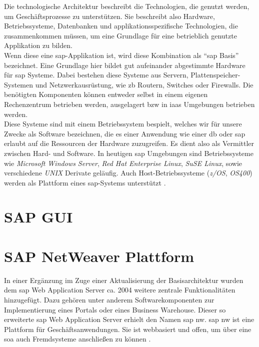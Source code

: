 Die technologische Architektur beschreibt die Technologien, die genutzt werden, um Geschäftsprozesse zu unterstützen. Sie beschreibt also Hardware, Betriebssysteme, Datenbanken und applikationsspezifische Technologien, die zusammenkommen müssen, um eine Grundlage für eine betrieblich genutzte Applikation zu bilden.\\
Wenn diese eine \gls{sap}-Applikation ist, wird diese Kombination als "`\gls{sap} Basis"' bezeichnet.
Eine Grundlage hier bildet gut aufeinander abgestimmte Hardware für \gls{sap} Systeme. Dabei bestehen diese Systeme aus Servern, Plattenspeicher-Systemen und Netzwerkausrüstung, wie \gls{zb} Routern, Switches oder Firewalls. Die benötigten Komponenten können entweder selbst in einem eigenen Rechenzentrum betrieben werden, ausgelagert \gls{bzw} in \gls{iaas} Umgebungen betrieben werden.\\
Diese Systeme sind mit einem Betriebssystem bespielt, welches wir für unsere Zwecke als Software bezeichnen, die es einer Anwendung wie einer \gls{db} oder \gls{sap} erlaubt auf die Ressourcen der Hardware zuzugreifen. Es dient also als Vermittler zwischen Hard- und Software.
In heutigen \gls{sap} Umgebungen sind Betriebssysteme wie \emph{Microsoft Windows Server}, \emph{Red Hat Enterprise Linux}, \emph{SuSE Linux}, sowie verschiedene \emph{UNIX} Derivate geläufig. Auch Host-Betriebssysteme (\emph{z/OS}, \emph{OS400}) werden als Plattform eines \gls{sap}-Systems unterstützt \cite{SAPin24hrs}. 

\section{SAP GUI}
\label{sec:sapgui}


\section{SAP NetWeaver Plattform}
\label{sec:netweaver}
In einer Ergänzung im Zuge einer Aktualisierung der Basisarchitektur wurden dem \gls{sap} Web Application Server ca. 2004 weitere zentrale Funktionalitäten hinzugefügt. Dazu gehören unter anderem Softwarekomponenten zur Implementierung eines Portals oder eines Business Warehouse. Dieser so erweiterte \gls{sap} Web Application Server erhielt den Namen \gls{sap} \gls{nw}. \gls{sap} \gls{nw} ist eine Plattform für Geschäftsanwendungen. Sie ist webbasiert und offen, um über eine \gls{soa} auch Fremdsysteme anschließen zu können \cite{saptec}.

